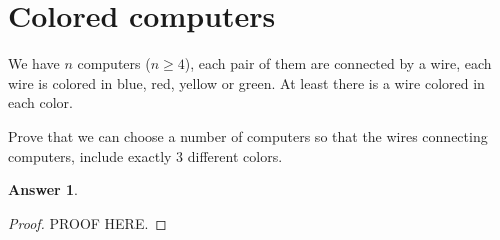 \documentclass[a4paper]{article}
\renewcommand{\(}{\left(}
\renewcommand{\)}{\right)}
\theoremstyle{plain}
\theoremstyle{plain}
\theoremstyle{definition}
\newtheorem*{answer}{Answer}
\begin{document}
\section{Colored computers}
We have $n$ computers ($n \geq 4$), each pair of them are connected by a wire, each wire is colored in blue, red, yellow or green. At least there is a wire colored in each color.

Prove that we can choose a number of computers so that the wires connecting computers, include exactly 3 different colors.

\begin{shaded}
\begin{answer}
\begin{proof}
PROOF HERE.
\end{proof}
\end{answer}
\end{shaded}
\end{document}
